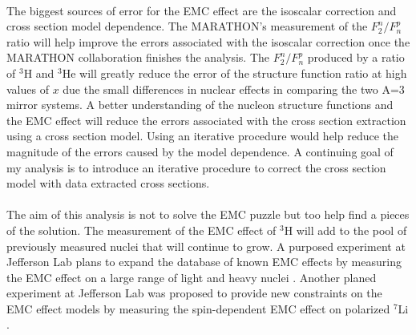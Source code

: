 \paragraph{}The biggest sources of error for the EMC effect are the isoscalar correction and cross section model dependence. The MARATHON's measurement of the $F^n_2/F^p_n$ ratio will help improve the errors associated with the isoscalar correction once the MARATHON collaboration finishes the analysis. The $F^n_2/F^p_n$ produced by a ratio of $^3$H and $^3$He will greatly reduce the error of the structure function ratio at high values of $x$ due the small differences in nuclear effects in comparing the two A=3 mirror systems. A better understanding of the nucleon structure functions and the EMC effect will reduce the errors associated with the cross section extraction using a cross section model. Using an iterative procedure would help reduce the magnitude of the errors caused by the model dependence. A continuing goal of my analysis is to introduce an iterative procedure to correct the cross section model with data extracted cross sections. 

\paragraph{}The aim of this analysis is not to solve the EMC puzzle but too help find a pieces of the solution. The measurement of the EMC effect of $^3$H will add to the pool of previously measured nuclei that will continue to grow. A purposed experiment at Jefferson Lab plans to expand the database of known EMC effects by measuring the EMC effect on a large range of light and heavy nuclei \cite{pro_gaskell}. Another planed experiment at Jefferson Lab was proposed to provide new constraints on the EMC effect models by measuring the spin-dependent EMC effect on polarized $^7$Li \cite{pro_brooks}.


